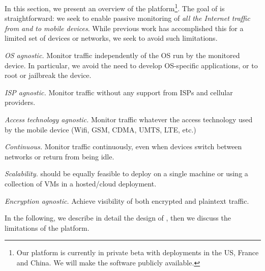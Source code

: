 In this section, we present an overview of the \platname{} platform\footnote{Our platform is currently in private beta with deployments in the US, France and China. We will make the \platname{} software publicly available.}. The goal of \platname{} is straightforward: we 
 seek to enable passive monitoring of \emph{all
  the Internet traffic from and to mobile devices}. While previous work has accomplished 
  this for a limited set of devices or networks, we seek to avoid such limitations. 
\begin{packedenumerate}
\item \emph{OS agnostic.} Monitor traffic independently of
  the OS run by the monitored device. In particular, we avoid the need to 
  develop OS-specific applications, or to root or jailbreak the device.
\item \emph{ISP agnostic.} Monitor traffic without any
  support from ISPs and cellular providers.
\item \emph{Access technology agnostic.} Monitor traffic
  whatever the access technology used by the mobile device (Wifi, GSM,
  CDMA, UMTS, LTE, etc.)
\item \emph{Continuous.} Monitor traffic continuously, even when devices switch 
between networks or return from being idle.

\item \emph{Scalability.} \platname{} should be equally feasible to deploy 
on a single machine or using a collection of VMs in a hosted/cloud deployment. 

\item \emph{Encryption agnostic.} Achieve visibility of both encrypted and plaintext traffic.

 \end{packedenumerate}    
 

In the following, we describe in detail the design of \platname{},
then we discuss the limitations of the platform.


